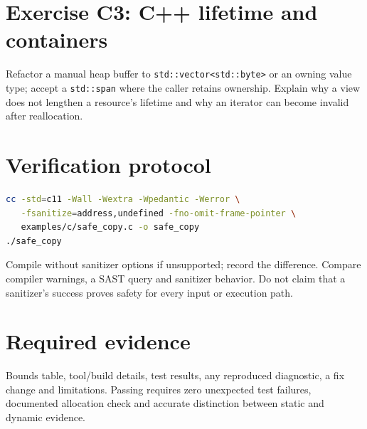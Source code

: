 \documentclass[10pt,letterpaper]{article}
\begin{document}
\section{Exercise C3: C++ lifetime and containers}
Refactor a manual heap buffer to \texttt{std::vector<std::byte>} or an owning value type; accept a \texttt{std::span} where the caller retains ownership. Explain why a view does not lengthen a resource's lifetime and why an iterator can become invalid after reallocation.
\section{Verification protocol}
\begin{lstlisting}[language=bash]
cc -std=c11 -Wall -Wextra -Wpedantic -Werror \
   -fsanitize=address,undefined -fno-omit-frame-pointer \
   examples/c/safe_copy.c -o safe_copy
./safe_copy
\end{lstlisting}
Compile without sanitizer options if unsupported; record the difference. Compare compiler warnings, a SAST query and sanitizer behavior. Do not claim that a sanitizer's success proves safety for every input or execution path.
\section{Required evidence}
Bounds table, tool/build details, test results, any reproduced diagnostic, a fix change and limitations. Passing requires zero unexpected test failures, documented allocation check and accurate distinction between static and dynamic evidence.
\end{document}
